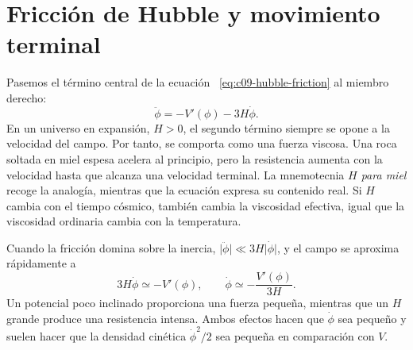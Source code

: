 \begin{classroomqa}
\end{classroomqa}

\section{Fricción de Hubble y movimiento terminal}

Pasemos el término central de la ecuación ~\eqref{eq:c09-hubble-friction} al miembro derecho:
\begin{equation}
\ddot\phi=-V'(\phi)-3H\dot\phi.
\end{equation}
En un universo en expansión, \(H>0\), el segundo término siempre se opone a la velocidad del campo. Por tanto, se comporta como una fuerza viscosa. Una roca soltada en miel espesa acelera al principio, pero la resistencia aumenta con la velocidad hasta que alcanza una velocidad terminal. La mnemotecnia \emph{\(H\) para miel } recoge la analogía, mientras que la ecuación expresa su contenido real. Si \(H\) cambia con el tiempo cósmico, también cambia la viscosidad efectiva, igual que la viscosidad ordinaria cambia con la temperatura.

Cuando la fricción domina sobre la inercia, \(\lvert\ddot\phi\rvert\ll3H\lvert\dot\phi\rvert\), y el campo se aproxima rápidamente a
\begin{equation}
3H\dot\phi\simeq -V'(\phi),
\qquad
\dot\phi\simeq-\frac{V'(\phi)}{3H}.
\label{eq:c09-terminal}
\end{equation}
Un potencial poco inclinado proporciona una fuerza pequeña, mientras que un \(H\) grande produce una resistencia intensa. Ambos efectos hacen que \(\dot\phi\) sea pequeño y suelen hacer que la densidad cinética \(\dot\phi^2/2\) sea pequeña en comparación con \(V\).

\begin{classroomqa}
\end{classroomqa}

